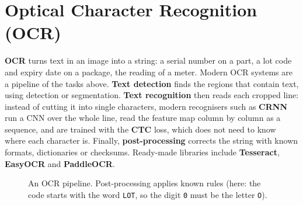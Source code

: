 \documentclass[12pt, a4paper]{article}
\begin{document}
\section{Optical Character Recognition (OCR)}
\label{sec:ocr}

\textbf{OCR} turns text in an image into a string: a serial number on a part,
a lot code and expiry date on a package, the reading of a meter. Modern OCR
systems are a pipeline of the tasks above. \textbf{Text detection} finds the
regions that contain text, using detection or segmentation. \textbf{Text
  recognition} then reads each cropped line: instead of cutting it into single
characters, modern recognisers such as \textbf{CRNN} run a CNN over the whole
line, read the feature map column by column as a sequence, and are trained
with the \textbf{CTC} loss, which does not need to know where each character
is. Finally, \textbf{post-processing} corrects the string with known formats,
dictionaries or checksums. Ready-made libraries include \textbf{Tesseract},
\textbf{EasyOCR} and \textbf{PaddleOCR}.

\begin{figure}[H]
  \centering
  \caption{An OCR pipeline. Post-processing applies known rules (here: the
    code starts with the word \texttt{LOT}, so the digit \texttt{0} must be the
    letter \texttt{O}).}
  \label{fig:ocr}
\end{figure}
\end{document}
